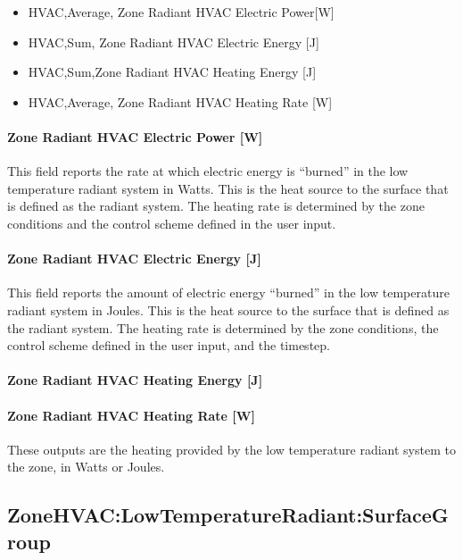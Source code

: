 \begin{itemize}
\item
  HVAC,Average, Zone Radiant HVAC Electric Power{[}W{]}
\item
  HVAC,Sum, Zone Radiant HVAC Electric Energy {[}J{]}
\item
  HVAC,Sum,Zone Radiant HVAC Heating Energy {[}J{]}
\item
  HVAC,Average, Zone Radiant HVAC Heating Rate {[}W{]}
\end{itemize}

\paragraph{Zone Radiant HVAC Electric Power {[}W{]}}\label{zone-radiant-hvac-electric-power-w}

This field reports the rate at which electric energy is ``burned'' in the low temperature radiant system in Watts. This is the heat source to the surface that is defined as the radiant system. The heating rate is determined by the zone conditions and the control scheme defined in the user input.

\paragraph{Zone Radiant HVAC Electric Energy {[}J{]}}\label{zone-radiant-hvac-electric-energy-j}

This field reports the amount of electric energy ``burned'' in the low temperature radiant system in Joules. This is the heat source to the surface that is defined as the radiant system. The heating rate is determined by the zone conditions, the control scheme defined in the user input, and the timestep.

\paragraph{Zone Radiant HVAC Heating Energy {[}J{]}}\label{zone-radiant-hvac-heating-energy-j-2}

\paragraph{Zone Radiant HVAC Heating Rate {[}W{]}}\label{zone-radiant-hvac-heating-rate-w-2}

These outputs are the heating provided by the low temperature radiant system to the zone, in Watts or Joules.

\subsection{ZoneHVAC:LowTemperatureRadiant:SurfaceGroup}\label{zonehvaclowtemperatureradiantsurfacegroup}

